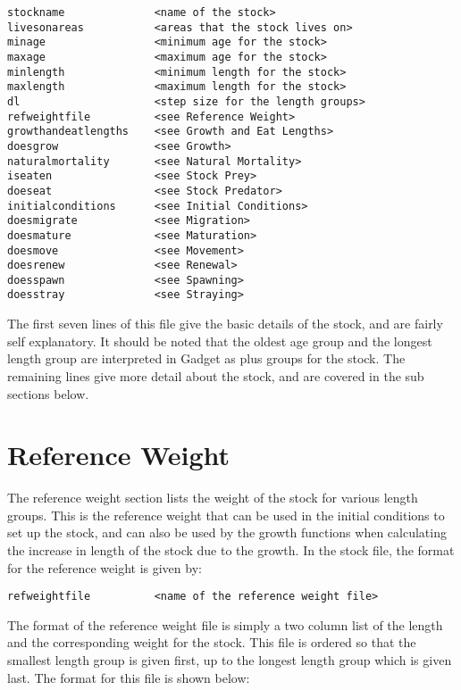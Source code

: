 \documentclass[]{book}
\begin{document}
\begin{verbatim}
stockname              <name of the stock>
livesonareas           <areas that the stock lives on>
minage                 <minimum age for the stock>
maxage                 <maximum age for the stock>
minlength              <minimum length for the stock>
maxlength              <maximum length for the stock>
dl                     <step size for the length groups>
refweightfile          <see Reference Weight>
growthandeatlengths    <see Growth and Eat Lengths>
doesgrow               <see Growth>
naturalmortality       <see Natural Mortality>
iseaten                <see Stock Prey>
doeseat                <see Stock Predator>
initialconditions      <see Initial Conditions>
doesmigrate            <see Migration>
doesmature             <see Maturation>
doesmove               <see Movement>
doesrenew              <see Renewal>
doesspawn              <see Spawning>
doesstray              <see Straying>
\end{verbatim}

The first seven lines of this file give the basic details of the stock,
and are fairly self explanatory. It should be noted that the oldest age
group and the longest length group are interpreted in Gadget as plus
groups for the stock. The remaining lines give more detail about the
stock, and are covered in the sub sections below.

\hypertarget{sec:stockrefweight}{%
\section{Reference Weight}\label{sec:stockrefweight}}

The reference weight section lists the weight of the stock for various
length groups. This is the reference weight that can be used in the
initial conditions to set up the stock, and can also be used by the
growth functions when calculating the increase in length of the stock
due to the growth. In the stock file, the format for the reference
weight is given by:

\begin{verbatim}
refweightfile          <name of the reference weight file>
\end{verbatim}

The format of the reference weight file is simply a two column list of
the length and the corresponding weight for the stock. This file is
ordered so that the smallest length group is given first, up to the
longest length group which is given last. The format for this file is
shown below:
\end{document}
